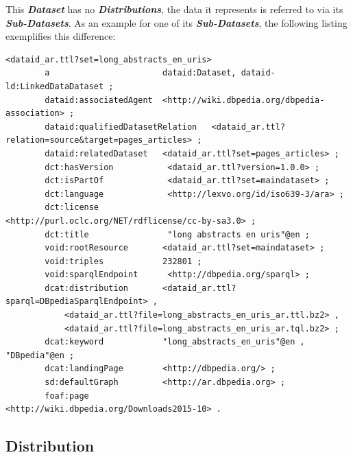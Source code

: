 \documentclass[a4paper,english,twoside,BCOR1.5cm,headsepline,DIV12,appendixprefix,final,12pt]{scrbook}
\newcommand{\important}[1]{\textbf{\textit{#1}}}
\begin{document}
This \important{Dataset} has no \important{Distributions}, the data it represents is referred to via its \important{Sub-Datasets}. As an example for one of its \important{Sub-Datasets}, the following listing exemplifies this difference:
\pagebreak
\begin{lstlisting}[language=ttl, captionpos=b,caption=A Dataset,label=lst:coresuperset,linewidth=\columnwidth,breaklines=true]
<dataid_ar.ttl?set=long_abstracts_en_uris>
        a                       dataid:Dataset, dataid-ld:LinkedDataDataset ;
        dataid:associatedAgent  <http://wiki.dbpedia.org/dbpedia-association> ;
        dataid:qualifiedDatasetRelation   <dataid_ar.ttl?relation=source&target=pages_articles> ;                 
        dataid:relatedDataset   <dataid_ar.ttl?set=pages_articles> ;
        dct:hasVersion           <dataid_ar.ttl?version=1.0.0> ;
        dct:isPartOf             <dataid_ar.ttl?set=maindataset> ;                                                 
        dct:language             <http://lexvo.org/id/iso639-3/ara> ;
        dct:license              <http://purl.oclc.org/NET/rdflicense/cc-by-sa3.0> ;
        dct:title                "long abstracts en uris"@en ;
        void:rootResource       <dataid_ar.ttl?set=maindataset> ;
        void:triples            232801 ;                                                                          
        void:sparqlEndpoint      <http://dbpedia.org/sparql> ;                                                    
        dcat:distribution       <dataid_ar.ttl?sparql=DBpediaSparqlEndpoint> ,                                    
            <dataid_ar.ttl?file=long_abstracts_en_uris_ar.ttl.bz2> ,
            <dataid_ar.ttl?file=long_abstracts_en_uris_ar.tql.bz2> ;
        dcat:keyword            "long_abstracts_en_uris"@en , "DBpedia"@en ;
        dcat:landingPage        <http://dbpedia.org/> ;
        sd:defaultGraph         <http://ar.dbpedia.org> ;                                                         
        foaf:page               <http://wiki.dbpedia.org/Downloads2015-10> . 
\end{lstlisting}

 
\subsection{Distribution} 
\label{sec:coredist}
\end{document}
